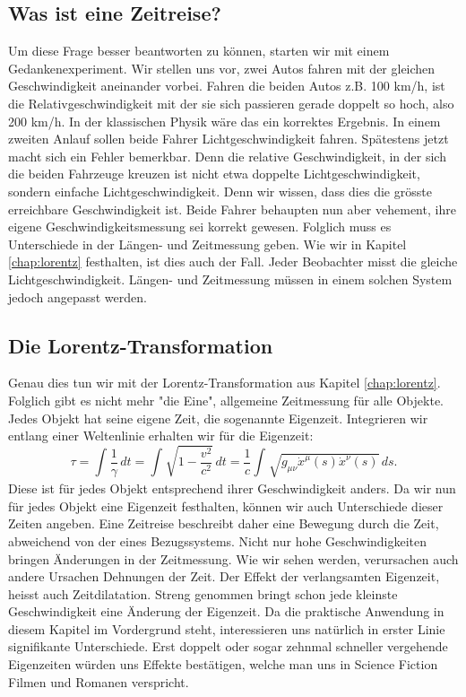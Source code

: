 \begin{refsection}
\section{Was ist eine Zeitreise?}\label{}

Um diese Frage besser beantworten zu können, starten wir mit einem Gedankenexperiment. Wir stellen uns vor, zwei Autos fahren mit der gleichen Geschwindigkeit aneinander vorbei. Fahren die beiden Autos z.B. 100 km/h, ist die Relativgeschwindigkeit mit der sie sich passieren gerade doppelt so hoch, also 200 km/h. In der klassischen Physik wäre das ein korrektes Ergebnis. In einem zweiten Anlauf sollen beide Fahrer Lichtgeschwindigkeit fahren. Spätestens jetzt macht sich ein Fehler bemerkbar. Denn die relative Geschwindigkeit, in der sich die beiden Fahrzeuge kreuzen ist nicht etwa doppelte Lichtgeschwindigkeit, sondern einfache Lichtgeschwindigkeit. Denn wir wissen, dass dies die grösste erreichbare Geschwindigkeit ist.
Beide Fahrer behaupten nun aber vehement, ihre eigene Geschwindigkeitsmessung sei korrekt gewesen. Folglich muss es Unterschiede in der Längen- und Zeitmessung geben.
Wie wir in Kapitel \ref{chap:lorentz} festhalten, ist dies auch der Fall. Jeder Beobachter misst die gleiche Lichtgeschwindigkeit. Längen- und Zeitmessung müssen in einem solchen System jedoch angepasst werden.

\subsection{Die Lorentz-Transformation}

Genau dies tun wir mit der Lorentz-Transformation aus Kapitel \ref{chap:lorentz}. Folglich gibt es nicht mehr "die Eine", allgemeine Zeitmessung für alle Objekte. Jedes Objekt hat seine eigene Zeit, die sogenannte Eigenzeit.
Integrieren wir entlang einer Weltenlinie erhalten wir für die Eigenzeit:
\begin{equation}\label{Eigenzeit}
\tau
=
\int_{}^{}\frac{1}{\gamma}\,dt=\int_{}^{}\sqrt{1-\frac{v^2}{c^2}}\,dt
=
\frac{1}{c}\int_{}^{}\sqrt{g_{\mu\nu}\dot{x}^{\mu}(s)\dot{x}^{\nu}(s)}\,ds.
\end{equation}
Diese ist für jedes Objekt entsprechend ihrer Geschwindigkeit anders.
Da wir nun für jedes Objekt eine Eigenzeit festhalten, können wir auch Unterschiede dieser Zeiten angeben.
Eine Zeitreise beschreibt daher eine Bewegung durch die Zeit, abweichend von der eines Bezugssystems. 
Nicht nur hohe Geschwindigkeiten bringen Änderungen in der Zeitmessung. Wie wir sehen werden, verursachen auch andere Ursachen Dehnungen der Zeit. Der Effekt der verlangsamten Eigenzeit, heisst auch Zeitdilatation.
Streng genommen bringt schon jede kleinste Geschwindigkeit eine Änderung der Eigenzeit. Da die praktische Anwendung in diesem Kapitel im Vordergrund steht, interessieren uns natürlich in erster Linie signifikante Unterschiede. Erst doppelt oder sogar zehnmal schneller vergehende Eigenzeiten w\"urden uns Effekte best\"atigen, welche man uns in Science Fiction Filmen und Romanen verspricht.


\end{refsection}
